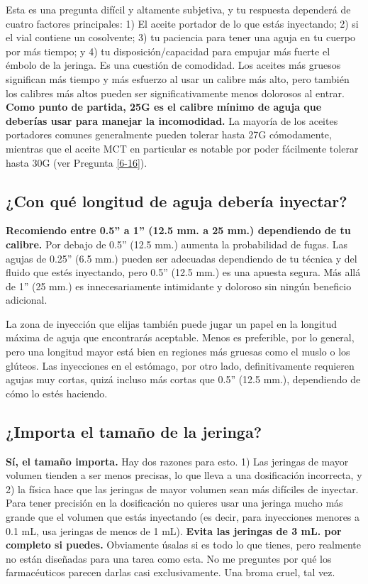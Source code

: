 \documentclass{article}
\begin{document}
Esta es una pregunta difícil y altamente subjetiva, y tu respuesta dependerá de cuatro factores principales: 1) El aceite portador de lo que estás inyectando; 2) si el vial contiene un cosolvente; 3) tu paciencia para tener una aguja en tu cuerpo por más tiempo; y 4) tu disposición/capacidad para empujar más fuerte el émbolo de la jeringa. Es una cuestión de comodidad. Los aceites más gruesos significan más tiempo y más esfuerzo al usar un calibre más alto, pero también los calibres más altos pueden ser significativamente menos dolorosos al entrar. \textbf{Como punto de partida, 25G es el calibre mínimo de aguja que deberías usar para manejar la incomodidad.} La mayoría de los aceites portadores comunes generalmente pueden tolerar hasta 27G cómodamente, mientras que el aceite MCT en particular es notable por poder fácilmente tolerar hasta 30G (ver Pregunta \ref{6-16}).

\subsection{¿Con qué longitud de aguja debería inyectar?}\label{5-17}

\textbf{Recomiendo entre 0.5” a 1” (12.5 mm. a 25 mm.) dependiendo de tu calibre.} Por debajo de 0.5” (12.5 mm.) aumenta la probabilidad de fugas. Las agujas de 0.25” (6.5 mm.) pueden ser adecuadas dependiendo de tu técnica y del fluido que estés inyectando, pero 0.5” (12.5 mm.) es una apuesta segura. Más allá de 1” (25 mm.) es innecesariamente intimidante y doloroso sin ningún beneficio adicional.

La zona de inyección que elijas también puede jugar un papel en la longitud máxima de aguja que encontrarás aceptable. Menos es preferible, por lo general, pero una longitud mayor está bien en regiones más gruesas como el muslo o los glúteos. Las inyecciones en el estómago, por otro lado, definitivamente requieren agujas muy cortas, quizá incluso más cortas que 0.5” (12.5 mm.), dependiendo de cómo lo estés haciendo.

\subsection{¿Importa el tamaño de la jeringa?}\label{5-18}

\textbf{Sí, el tamaño importa.} Hay dos razones para esto. 1) Las jeringas de mayor volumen tienden a ser menos precisas, lo que lleva a una dosificación incorrecta, y 2) la física hace que las jeringas de mayor volumen sean más difíciles de inyectar. Para tener precisión en la dosificación no quieres usar una jeringa mucho más grande que el volumen que estás inyectando (es decir, para inyecciones menores a 0.1 mL, usa jeringas de menos de 1 mL). \textbf{Evita las jeringas de 3 mL. por completo si puedes.} Obviamente úsalas si es todo lo que tienes, pero realmente no están diseñadas para una tarea como esta. No me preguntes por qué los farmacéuticos parecen darlas casi exclusivamente. Una broma cruel, tal vez.
\end{document}
